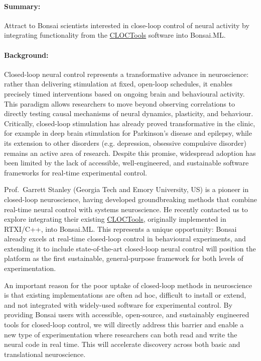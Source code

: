 \paragraph{Summary:} Attract to Bonsai scientists interested in close-loop
control of neural activity by integrating functionality from
the \href{https://cloctools.github.io/}{CLOCTools} software into Bonsai.ML.

\paragraph{Background:} Closed-loop neural control represents a transformative
advance in neuroscience:  rather than delivering stimulation at fixed,
open-loop schedules, it enables precisely timed interventions based on ongoing
brain and behavioural activity. This paradigm allows researchers to move beyond
observing correlations to  directly testing causal mechanisms of neural
dynamics, plasticity, and behaviour. Critically, closed-loop stimulation has
already proved transformative in the  clinic, for example in deep brain
stimulation for Parkinson’s disease and  epilepsy, while its extension to other
disorders (e.g. depression, obsessive  compulsive disorder) remains an active
area of research. Despite this promise, widespread adoption has been limited
by the lack of accessible, well-engineered,  and sustainable software
frameworks for real-time experimental control.

Prof.~Garrett Stanley (Georgia Tech and Emory University, US) is a pioneer in
closed-loop neuroscience, having developed groundbreaking methods that combine
real-time neural control with systems neuroscience. He recently contacted us to
explore integrating their existing
\href{https://cloctools.github.io/}{CLOCTools}, originally implemented in
RTXI/C++, into Bonsai.ML.  This represents a unique opportunity: Bonsai already
excels at real-time closed-loop control in behavioural experiments, and
extending it to include state-of-the-art closed-loop neural control will
position the platform as the first sustainable, general-purpose framework for
both levels of experimentation.

An important reason for the poor uptake of closed-loop methods in neuroscience
is that existing implementations are often ad hoc, difficult to install or
extend, and not integrated with widely-used software for experimental control.
By providing Bonsai users with accessible, open-source, and sustainably
engineered tools for closed-loop control, we will directly address this barrier
and enable a new type of experimentation where researchers can both read and
write the neural code in real time. This will accelerate discovery across both
basic and translational neuroscience.


